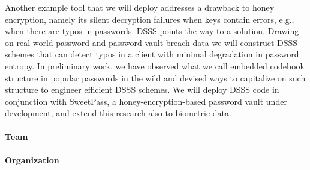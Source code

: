 Another example tool that we will deploy addresses a drawback to honey encryption, namely its silent decryption failures when keys contain errors, e.g., when there are typos in passwords. DSSS points the way to a solution.
Drawing on real-world password and password-vault breach data we will construct DSSS schemes that can detect typos in a client with minimal degradation in password entropy. In preliminary work, we have observed what we call embedded codebook structure in popular passwords in the wild and devised ways to capitalize on such structure to engineer efficient DSSS schemes. We will deploy DSSS code in conjunction with SweetPass, a honey-encryption-based password vault under development, and extend this research also to biometric data. 


\paragraph{Team}


\paragraph{Organization}





